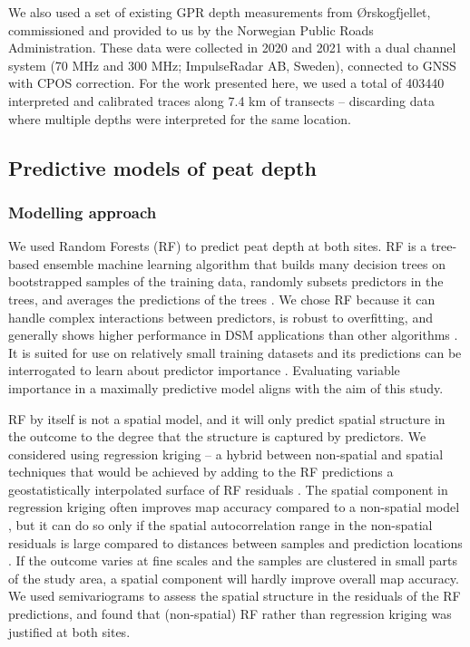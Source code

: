 \documentclass[soil, manuscript]{copernicus}
\begin{document}
We also used a set of existing GPR depth measurements from Ørskogfjellet, commissioned and provided to us by the Norwegian Public Roads Administration.
These data were collected in 2020 and 2021 with a dual channel system (70 MHz and 300 MHz; ImpulseRadar AB, Sweden), connected to GNSS with CPOS correction.
For the work presented here, we used a total of 403440 interpreted and calibrated traces along 7.4 km of transects -- discarding data where multiple depths were interpreted for the same location.

\subsection{Predictive models of peat depth}

\subsubsection{Modelling approach}

We used Random Forests (RF) to predict peat depth at both sites.
RF is a tree-based ensemble machine learning algorithm that builds many decision trees on bootstrapped samples of the training data, randomly subsets predictors in the trees, and averages the predictions of the trees \citep{breimanRandomForests2001}.
We chose RF because it can handle complex interactions between predictors, is robust to overfitting, and generally shows higher performance in DSM applications than other algorithms \citep{beguinPredictingSoilProperties2017, nussbaumEvaluationDigitalSoil2018, lamichhaneDigitalSoilMapping2019}.
It is suited for use on relatively small training datasets and its predictions can be interrogated to learn about predictor importance \citep{khaledianSelectingAppropriateMachine2020}.
Evaluating variable importance in a maximally predictive model aligns with the aim of this study.

RF by itself is not a spatial model, and it will only predict spatial structure in the outcome to the degree that the structure is captured by predictors.
We considered using regression kriging -- a hybrid between non-spatial and spatial techniques that would be achieved by adding to the RF predictions a geostatistically interpolated surface of RF residuals \citep{henglGenericFrameworkSpatial2004}.
The spatial component in regression kriging often improves map accuracy compared to a non-spatial model \citep{beguinPredictingSoilProperties2017, lamichhaneDigitalSoilMapping2019, mollaMachineLearningGeostatistical2023}, but it can do so only if the spatial autocorrelation range in the non-spatial residuals is large compared to distances between samples and prediction locations \citep{henglGenericFrameworkSpatial2004, szaboMappingSoilHydraulic2019, takoutsingComparingPredictionPerformance2022}.
If the outcome varies at fine scales and the samples are clustered in small parts of the study area, a spatial component will hardly improve overall map accuracy.
We used semivariograms to assess the spatial structure in the residuals of the RF predictions, and found that (non-spatial) RF rather than regression kriging was justified at both sites.
\end{document}
